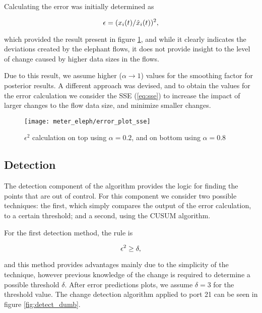 \par Calculating the error was initially determined as

\begin{equation}
    \centering
    \label{eq:division}
    \epsilon = (x_i(t)/\hat{x}_i(t))^2,
\end{equation}

\par which provided the result present in figure \ref{fig:error_plot_division_sse}, and while it clearly indicates the deviations created by the elephant flows, it 
does not provide insight to the level of change caused by higher data sizes in the flows.

Due to this result, we assume higher ($\alpha \rightarrow 1$) values for the smoothing factor for posterior results. A different approach was devised,
and to obtain the values for the error calculation we consider the SSE (\ref{eq:sse}) to increase the impact of larger changes to the flow data size,
and minimize smaller changes.

\begin{figure} [H]
    \texttt{[image: meter\_eleph/error\_plot\_sse]}
    \caption{$\epsilon^2$ calculation on top using $\alpha = 0.2$, and on bottom using $\alpha = 0.8$}
    \label{fig:error_plot_division_sse}
\end{figure}

\subsection{Detection}

The detection component of the algorithm provides the logic for finding the points that are out of control. For this component we consider two possible techniques:
the first, which simply compares the output of the error calculation, to a certain threshold; and a second, using the CUSUM algorithm. 

\par For the first detection method, the rule is 

\begin{equation*}
    \centering
    \label{eq:detection_method}
    \epsilon^2 \geq \delta,
\end{equation*}

\par and this method provides advantages mainly due to the simplicity of the technique, however previous knowledge of the change is required to determine a possible
threshold $\delta$. After error predictions plots, we assume $\delta = 3$ for the threshold value. The change detection algorithm applied to port 21 can be seen 
in figure \ref{fig:detect_dumb}.

